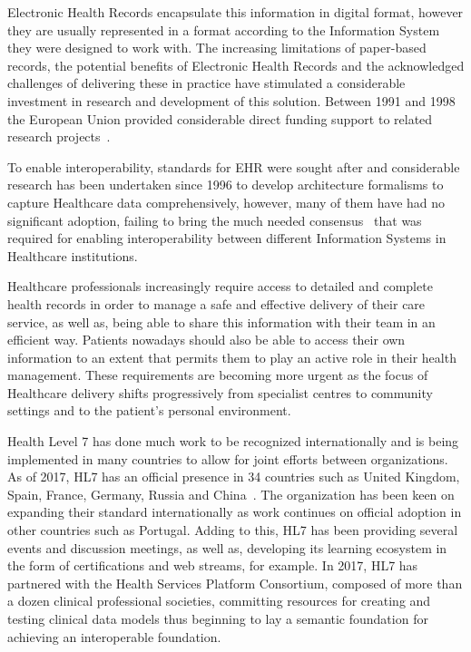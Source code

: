 Electronic Health Records encapsulate this information in digital format,
however they are usually represented in a format according to the Information
System they were designed to work with. The increasing limitations of
paper-based records, the potential benefits of Electronic Health Records and
the acknowledged challenges of delivering these in practice have stimulated a
considerable investment in research and development of this solution.  Between
1991 and 1998 the European Union provided considerable direct funding support
to related research projects~\cite{Kalra2006}.

To enable interoperability, standards for EHR were sought after and
considerable research has been undertaken since 1996 to develop architecture
formalisms to capture Healthcare data comprehensively, however, many of them
have had no significant adoption, failing to bring the much needed
consensus~\cite{Eichelberg2006} that was required for enabling interoperability
between different Information Systems in Healthcare institutions. 

Healthcare professionals increasingly require access to detailed and complete
health records in order to manage a safe and effective delivery of their care
service, as well as, being able to share this information with their team in an
efficient way. Patients nowadays should also be able to access their own
information to an extent that permits them to play an active role in their
health management. These requirements are becoming more urgent as the focus of
Healthcare delivery shifts progressively from specialist centres to community
settings and to the patient’s personal environment.

Health Level 7 has done much work to be recognized internationally and is being
implemented in many countries to allow for joint efforts between organizations.
As of 2017, HL7 has an official presence in 34 countries such as United
Kingdom, Spain, France, Germany, Russia and China~\cite{HL7Anual2016}. The
organization has been keen on expanding their standard internationally as work
continues on official adoption in other countries such as Portugal. Adding to
this, HL7 has been providing several events and discussion meetings, as well
as, developing its learning ecosystem in the form of certifications and web
streams, for example. In 2017, HL7 has partnered with the Health Services
Platform Consortium, composed of more than a dozen clinical professional
societies, committing resources for creating and testing clinical data models
thus beginning to lay a semantic foundation for achieving an interoperable
foundation.

